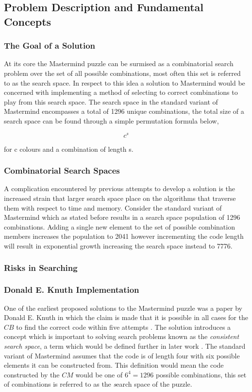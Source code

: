 \documentclass[12pt]{article}  %
\theoremstyle{definition}
\theoremstyle{remark}
\begin{document}
\subsection {Problem Description and Fundamental Concepts}

\subsubsection {The Goal of a Solution}
At its core the Mastermind puzzle can be surmised as a combinatorial search problem over the set of all possible combinations, most often this set is referred to as the search space. In respect to this idea a solution to Mastermind would be concerned with implementing a method of selecting to correct combinations to play from this search space. The search space in the standard variant of Mastermind encompasses a total of 1296 unique combinations, the total size of a search space can be found through a simple permutation formula below,

\[ c^s\]

for c colours and a combination of length s.

\subsubsection {Combinatorial Search Spaces}

A complication encountered by previous attempts to develop a solution is the increased strain that larger search space place on the algorithms that traverse them with respect to time and memory. Consider the standard variant of Mastermind which as stated before results in a search space population of 1296 combinations. Adding a single new element to the set of possible combination members increases the population to 2041 however incrementing the code length will result in exponential growth increasing the search space instead to 7776. 


\subsubsection {Risks in Searching}

\subsubsection {Donald E. Knuth Implementation}

\par One of the earliest proposed solutions to the Mastermind puzzle was a paper by Donald E. Knuth in which the claim is made that it is possible in all cases for the $CB$ to find the correct code within five attempts \cite {Wolfram} \cite {Knuth}. The solution introduces a concept which is important to solving search problems known as the \emph{consistent search space}, a term which would be defined further in later work \cite{Merelo}. The standard variant of Mastermind assumes that the code is of length four with six possible elements it can be constructed from. This definition would mean the code constructed by the $CM$ would be one of $6^4 = 1296$ possible combinations, this set of combinations is referred to as the \emph search space of the puzzle. 
\end{document}
